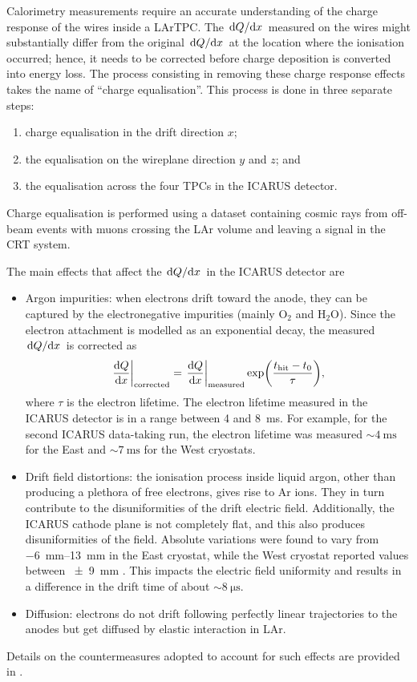 Calorimetry measurements require an accurate understanding of the charge response of the wires inside a LArTPC. The $\dv*{Q}{x}$ measured on the wires might substantially differ from the original $\dv*{Q}{x}$ at the location where the ionisation occurred; hence, it needs to be corrected before charge deposition is converted into energy loss. The process consisting in removing these charge response effects takes the name of ``charge equalisation''. This process is done in three separate steps: \begin{enumerate}
    \item charge equalisation in the drift direction $x$;
    \item the equalisation on the wireplane direction $y$ and $z$; and 
    \item the equalisation across the four TPCs in the ICARUS detector. 
\end{enumerate} Charge equalisation is performed using a dataset containing cosmic rays from off-beam events with muons crossing the LAr volume and leaving a signal in the CRT system.

The main effects that affect the $\dv*{Q}{x}$ in the ICARUS detector are \begin{itemize}
    \item Argon impurities: when electrons drift toward the anode, they can be captured by the electronegative impurities (mainly $\mathrm{O_2}$ and $\mathrm{H_2O}$). Since the electron attachment is modelled as an exponential decay, the measured $\dv*{Q}{x}$ is corrected as \begin{equation}
        \eval{\dv{Q}{x}}_\mathrm{corrected} = \eval{\dv{Q}{x}}_\mathrm{measured} \exp(\frac{t_\mathrm{hit}-t_0}{\tau}),
    \end{equation} where $\tau$ is the electron lifetime. The electron lifetime measured in the ICARUS detector is in a range between 4 and \SI{8}{\ms}. For example, for the second ICARUS data-taking run, the electron lifetime was measured ${\sim}\SI{4}{\ms}$ for the East and ${\sim}\SI{7}{\ms}$ for the West cryostats. 

    \item Drift field distortions: the ionisation process inside liquid argon, other than producing a plethora of free electrons, gives rise to Ar ions. They in turn contribute to the disuniformities of the drift electric field. Additionally, the ICARUS cathode plane is not completely flat, and this also produces disuniformities of the field. Absolute variations were found to vary from \qtyrange{-6}{13}{\mm} in the East cryostat, while the West cryostat reported values between \SI{+-9}{\mm} \cite{arteroponsStudyReconstructionNuMuCC}. This impacts the electric field uniformity and results in a difference in the drift time of about ${\sim}\SI{8}{\us}$. 

    \item Diffusion: electrons do not drift following perfectly linear trajectories to the anodes but get diffused by elastic interaction in LAr. 
\end{itemize} Details on the countermeasures adopted to account for such effects are provided in \cite{arteroponsStudyReconstructionNuMuCC}. 

